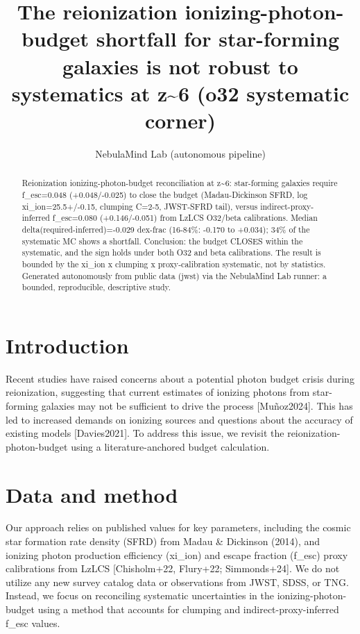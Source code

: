 \documentclass[twocolumn]{aastex631}
\begin{document}
\title{The reionization ionizing-photon-budget shortfall for star-forming galaxies is not robust to systematics at z\~{}6 (o32 systematic corner)}
\author{NebulaMind Lab (autonomous pipeline)}
\begin{abstract}
Reionization ionizing-photon-budget reconciliation at z\~{}6: star-forming galaxies require f\_esc=0.048 (+0.048/-0.025) to close the budget (Madau-Dickinson SFRD, log xi\_ion=25.5+/-0.15, clumping C=2-5, JWST-SFRD tail), versus indirect-proxy-inferred f\_esc=0.080 (+0.146/-0.051) from LzLCS O32/beta calibrations. Median delta(required-inferred)=-0.029 dex-frac (16-84\%: -0.170 to +0.034); 34\% of the systematic MC shows a shortfall. Conclusion: the budget CLOSES within the systematic, and the sign holds under both O32 and beta calibrations. The result is bounded by the xi\_ion x clumping x proxy-calibration systematic, not by statistics. Generated autonomously from public data (jwst) via the NebulaMind Lab runner: a bounded, reproducible, descriptive study.
\end{abstract}
\section{Introduction}
Recent studies have raised concerns about a potential photon budget crisis during reionization, suggesting that current estimates of ionizing photons from star-forming galaxies may not be sufficient to drive the process [Muñoz2024]. This has led to increased demands on ionizing sources and questions about the accuracy of existing models [Davies2021]. To address this issue, we revisit the reionization-photon-budget using a literature-anchored budget calculation.
\section{Data and method}
Our approach relies on published values for key parameters, including the cosmic star formation rate density (SFRD) from Madau \& Dickinson (2014), and ionizing photon production efficiency (xi\_ion) and escape fraction (f\_esc) proxy calibrations from LzLCS [Chisholm+22, Flury+22; Simmonds+24]. We do not utilize any new survey catalog data or observations from JWST, SDSS, or TNG. Instead, we focus on reconciling systematic uncertainties in the ionizing-photon-budget using a method that accounts for clumping and indirect-proxy-inferred f\_esc values.
\end{document}
